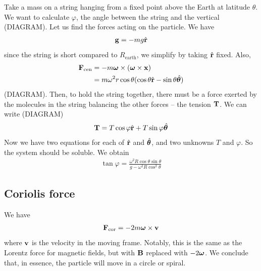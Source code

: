\documentclass{../../template/note}
\begin{document}
    \begin{example*}
        Take a mass on a string hanging from a fixed point above the Earth at latitude \(\theta\). We want to calculate \(\varphi\), the angle between the string and the vertical (DIAGRAM). Let us find the forces acting on the particle. We have
        \begin{align*}
            \V g = -mg \hvec r
        \end{align*}
        since the string is short compared to \(R_\text{earth}\), we simplify by taking \(\hvec r\) fixed. Also,
        \begin{align*}
            \V F_\text{cen} &= -m \V \omega \times (\V \omega \times \V x) \\
            &= m\omega^2 r \cos \theta (\cos \theta \hvec r - \sin \theta \hvec \theta)
        \end{align*}
        (DIAGRAM). Then, to hold the string together, there must be a force exerted by the molecules in the string balancing the other forces --  the tension \(\V T\). We can write (DIAGRAM)
        \begin{align*}
            \V T = T \cos \varphi \hvec r + T \sin \varphi \hvec \theta
        \end{align*}
        Now we have two equations for each of \(\hvec r\) and \(\hvec \theta\), and two unknowns \(T\) and \(\varphi\). So the system should be soluble. We obtain
        \begin{align*}
            \tan \varphi = \frac{\omega^2 R \cos \theta \sin \theta}{g - \omega^2 R \cos^2\theta}
        \end{align*}       
    \end{example*}
    
    \subsection{Coriolis force}

    We have
    \begin{align*}
        \V F_\text{cor} = -2m \V \omega \times \V v
    \end{align*}
    where \(\V v\) is the velocity in the moving frame. Notably, this is the same as the Lorentz force for magnetic fields, but with \(\V B\) replaced with \(-2 \V \omega\). We conclude that, in essence, the particle will move in a circle or spiral.
    
\end{document}
